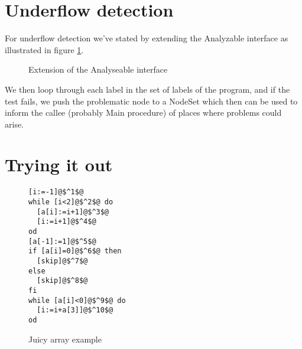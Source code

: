 \section{Underflow detection}

For underflow detection we've stated by extending the Analyzable interface as illustrated in figure \ref{fig:analysable_underflow_extension}.
\begin{figure}
\centering
{}
\caption{Extension of the Analyseable interface}
\label{fig:analysable_underflow_extension}
\end{figure}

We then loop through each label in the set of labels of the program, and if the test fails, we push the problematic node to a NodeSet which then can be used to inform the callee (probably Main procedure) of places where problems could arise.




\section{Trying it out}
\begin{figure}
  \begin{lstlisting}
[i:=-1]@$^1$@
while [i<2]@$^2$@ do
  [a[i]:=i+1]@$^3$@
  [i:=i+1]@$^4$@
od
[a[-1]:=1]@$^5$@
if [a[i]=0]@$^6$@ then
  [skip]@$^7$@
else
  [skip]@$^8$@
fi
while [a[i]<0]@$^9$@ do
  [i:=i+a[3]]@$^10$@
od
 \end{lstlisting}
 \caption{Juicy array example}
\label{code:juicy_array_example}
\end{figure}

